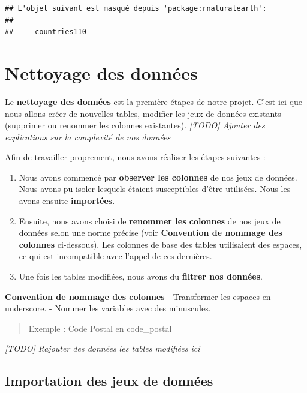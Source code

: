 \documentclass[
]{article}
\begin{document}
\begin{verbatim}
## L'objet suivant est masqué depuis 'package:rnaturalearth':
## 
##     countries110
\end{verbatim}

\hypertarget{nettoyage-des-donnuxe9es}{%
\section{Nettoyage des données}\label{nettoyage-des-donnuxe9es}}

Le \textbf{nettoyage des données} est la première étapes de notre
projet. C'est ici que nous allons créer de nouvelles tables, modifier
les jeux de données existants (supprimer ou renommer les colonnes
existantes). \emph{{[}TODO{]} Ajouter des explications sur la complexité
de nos données}

Afin de travailler proprement, nous avons réaliser les étapes suivantes
:

\begin{enumerate}
\def\labelenumi{\arabic{enumi}.}
\item
  Nous avons commencé par \textbf{observer les colonnes} de nos jeux de
  données. Nous avons pu isoler lesquels étaient susceptibles d'être
  utilisées. Nous les avons ensuite \textbf{importées}.
\item
  Ensuite, nous avons choisi de \textbf{renommer les colonnes} de nos
  jeux de données selon une norme précise (voir \textbf{Convention de
  nommage des colonnes} ci-dessous). Les colonnes de base des tables
  utilisaient des espaces, ce qui est incompatible avec l'appel de ces
  dernières.
\item
  Une fois les tables modifiées, nous avons du \textbf{filtrer nos
  données}.
\end{enumerate}

\textbf{Convention de nommage des colonnes} - Transformer les espaces en
underscore. - Nommer les variables avec des minuscules.

\begin{quote}
Exemple : Code Postal en code\_postal
\end{quote}

\emph{{[}TODO{]} Rajouter des données les tables modifiées ici}

\hypertarget{importation-des-jeux-de-donnuxe9es}{%
\subsection{Importation des jeux de
données}\label{importation-des-jeux-de-donnuxe9es}}
\end{document}
